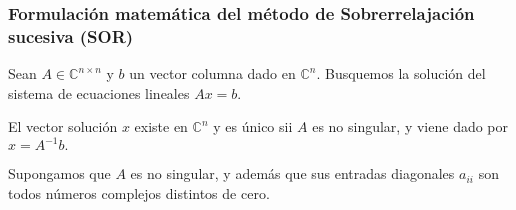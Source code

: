 \begin{frame}

	\frametitle{Formulación matemática del método de Sobrerrelajación sucesiva (SOR)}
	Sean $A\in\mathbb{C}^{n\times n}$ y $b$ un vector columna dado en
	$\mathbb{C}^{n}$.
	Busquemos la solución del sistema de ecuaciones lineales
	\begin{math}
		Ax=b.
	\end{math}

	El vector solución $x$ existe en $\mathbb{C}^{n}$ y es único sii
	$A$ es no singular, y viene dado por
	\begin{math}
		x=A^{-1}b.
	\end{math}

	Supongamos que $A$ es no singular, y además que sus entradas
	diagonales $a_{ii}$ son todos números complejos distintos de cero.


\end{frame}

